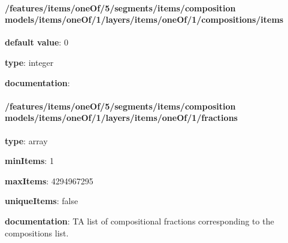 \begin{itemized}
\paragraph{/features/items/oneOf/5/segments/items/composition models/items/oneOf/1/layers/items/oneOf/1/compositions/items} \begin{itemized}
\item {\bf default value}: 0
\item {\bf type}: integer
\item {\bf documentation}: 
\end{itemized}\end{itemized}\paragraph{/features/items/oneOf/5/segments/items/composition models/items/oneOf/1/layers/items/oneOf/1/fractions} \begin{itemized}
\item {\bf type}: array
\item {\bf minItems}: 1
\item {\bf maxItems}: 4294967295
\item {\bf uniqueItems}: false
\item {\bf documentation}: TA list of compositional fractions corresponding to the compositions list.

\end{itemized}
